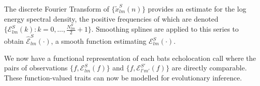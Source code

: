 \documentclass[wsdraft]{ws-rv9x6} %
\begin{document}
The discrete Fourier Transform\cite{antoniou2006digital}
of \(\{\tilde{x}_{lm}^{S}(n)\}\) provides an estimate for the log energy spectral density, the positive frequencies of which are denoted \(\{\mathcal{E}_{lm}^S(k) : k = 0, \dots, \frac{ N_{lm}^S}{2} + 1\}\). Smoothing splines\cite{friedman2001elements} are applied to this series to obtain \(\hat{\mathcal{E}}_{lm}^{S}(\cdot)\), a smooth function estimating \(\mathcal{E}_{lm}^{S}(\cdot)\).

We now have a functional representation of each bats echolocation call where the pairs of observations \(\{f, \mathcal{E}_{lm}^S(f)\}\) and \(\{f, \mathcal{E}_{l'm'}^{S'}(f)\}\) are directly comparable. These function-valued traits can now be modelled for evolutionary inference.




\end{document}
